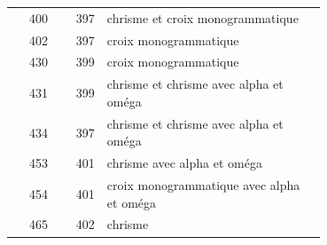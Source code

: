 \begin{longtable}{@{}r r p{0.7\linewidth}@{}}
400 & 397 & chrisme et croix monogrammatique \\
402 & 397 & croix monogrammatique \\
430 & 399 & croix monogrammatique \\
431 & 399 & chrisme et chrisme avec alpha et oméga \\
434 & 397 & chrisme et chrisme avec alpha et oméga \\
453 & 401 & chrisme avec alpha et oméga \\
454 & 401 & croix monogrammatique avec alpha et oméga \\
465 & 402 & chrisme \\
\end{longtable}
